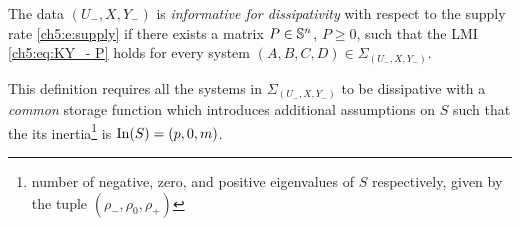 \begin{definition}\label{def:dd diss}
The data $(U_-,X,Y_-)$ is \emph{informative for dissipativity\/} with respect to the supply rate \eqref{ch5:e:supply} if there exists a matrix $P \in \S{n}$, $P \geq0$, such that the LMI \eqref{ch5:eq:KY_- P} holds for every system $(A,B,C,D) \in \Sigma_{(U_-,X,Y_-)}$. 
\end{definition}
This definition requires all the systems in $\Sigma_{(U_-,X,Y_-)}$ to be dissipative with a \emph{common} storage function which introduces additional assumptions on $S$ such that the its inertia\footnote{number of negative, zero, and positive eigenvalues of $S$ respectively, given by the tuple $(\rho_-, \rho_0, \rho_+)$} is $\In(S)=(p,0,m)$.

